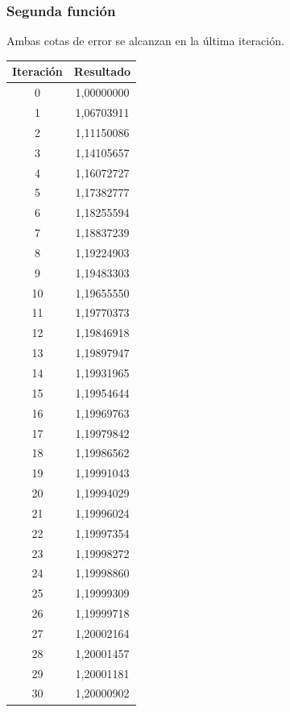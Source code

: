 \documentclass[titlepage,a4paper]{article}
\begin{document}
\subsubsection{Segunda función}\label{sec:NR2}
Ambas cotas de error se alcanzan en la última iteración.\\
\begin{center}
    \begin{tabular}{| c | c |}
    \hline
     Iteración & Resultado \\ \hline
        0     & 1,00000000 \\
        1     & 1,06703911 \\
        2     & 1,11150086 \\
        3     & 1,14105657 \\
        4     & 1,16072727 \\
        5     & 1,17382777 \\
        6     & 1,18255594 \\
        7     & 1,18837239 \\
        8     & 1,19224903 \\
        9     & 1,19483303 \\
        10    & 1,19655550 \\
        11    & 1,19770373 \\
        12    & 1,19846918 \\
        13    & 1,19897947 \\
        14    & 1,19931965 \\
        15    & 1,19954644 \\
        16    & 1,19969763 \\
        17    & 1,19979842 \\
        18    & 1,19986562 \\
        19    & 1,19991043 \\
        20    & 1,19994029 \\
        21    & 1,19996024 \\
        22    & 1,19997354 \\
        23    & 1,19998272 \\
        24    & 1,19998860 \\
        25    & 1,19999309 \\
        26    & 1,19999718 \\
        27    & 1,20002164 \\
        28    & 1,20001457 \\
        29    & 1,20001181 \\
        30    & 1,20000902 \\
    \hline
    \end{tabular}
\end{center}
\end{document}
